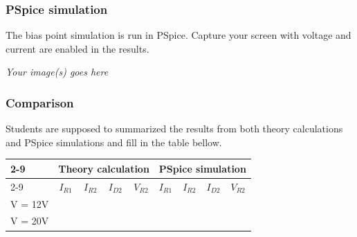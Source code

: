 \dotfill\bigskip\par\mbox{}\dotfill
\dotfill\bigskip\par\mbox{}\dotfill
\dotfill\bigskip\par\mbox{}\dotfill
\dotfill\bigskip\par\mbox{}\dotfill

\subsubsection{PSpice simulation}
The bias point simulation is run in PSpice. Capture your screen with voltage and current are enabled in the results.

\textit{Your image(s) goes here}\\
\vspace{8cm}

\subsubsection{Comparison}

Students are supposed to summarized the results from both theory calculations and PSpice simulations and fill in the table bellow.\\

\begin{center}
    
\begin{tabular}{l|l|l|l|l|l|l|l|l|}
\cline{2-9}
                              & \multicolumn{4}{c|}{Theory calculation}                                                                                       & \multicolumn{4}{c|}{PSpice simulation}    \\ \cline{2-9} 
                              & \multicolumn{1}{c|}{$I_{R1}$} & \multicolumn{1}{c|}{$I_{R2}$} & \multicolumn{1}{c|}{$I_{D2}$} & \multicolumn{1}{c|}{$V_{R2}$} & $I_{R1}$ & $I_{R2}$ & $I_{D2}$ & $V_{R2}$ \\ \hline
\multicolumn{1}{|l|}{V = 12V} &                               &                               &                               &                               &          &          &          &          \\ \hline
\multicolumn{1}{|l|}{V = 20V} &                               &                               &                               &                               &          &          &          &          \\ \hline
\end{tabular}
\end{center}


